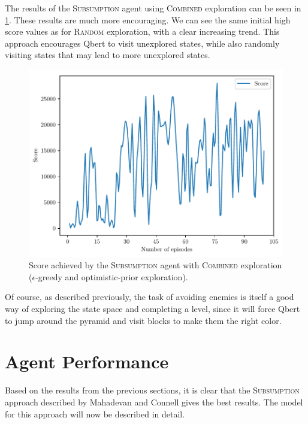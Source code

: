 \documentclass[a4paper,titlepage]{article}
\begin{document}
	The results of the \textsc{Subsumption} agent using \textsc{Combined} exploration can be seen in \cref{fig:subsumption_combined}. These results are much more encouraging. We can see the same initial high score values as for \textsc{Random} exploration, with a clear increasing trend. This approach encourages Qbert to visit unexplored states, while also randomly visiting states that may lead to more unexplored states.
	
	\begin{figure}[!htb]
		\centering
		\includegraphics[width=\columnwidth]{plots/subsumption_combined.pdf}
		\caption
		{Score achieved by the \textsc{Subsumption} agent with \textsc{Combined} exploration ($\epsilon$-greedy and optimistic-prior exploration).}
		\label{fig:subsumption_combined}
	\end{figure}
	
	Of course, as described previously, the task of avoiding enemies is itself a good way of exploring the state space and completing a level, since it will force Qbert to jump around the pyramid and visit blocks to make them the right color.
	
	\section{Agent Performance} \label{sec:performance}
	
	Based on the results from the previous sections, it is clear that the \textsc{Subsumption} approach described by Mahadevan and Connell \cite{mahadevan} gives the best results. The model for this approach will now be described in detail.
	
\end{document}

